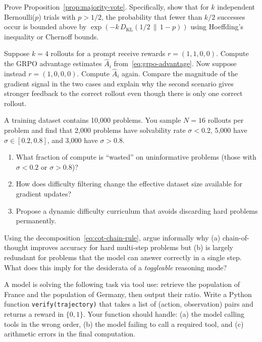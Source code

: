 \begin{exercise}
\label{ex:majority-vote-bound}
Prove Proposition~\ref{prop:majority-vote}. Specifically, show that
for $k$ independent Bernoulli($p$) trials with $p > 1/2$, the
probability that fewer than $k/2$ successes occur is bounded above
by $\exp(-k\,D_{\mathrm{KL}}(1/2\,\|\,1-p))$ using Hoeffding's inequality
or Chernoff bounds.
\end{exercise}

\begin{exercise}
\label{ex:grpo-advantage}
Suppose $k = 4$ rollouts for a prompt receive rewards $r = (1, 1, 0, 0)$.
Compute the GRPO advantage estimates $\hat{A}_i$ from~\eqref{eq:grpo-advantage}.
Now suppose instead $r = (1, 0, 0, 0)$. Compute $\hat{A}_i$ again.
Compare the magnitude of the gradient signal in the two cases and
explain why the second scenario gives stronger feedback to the correct
rollout even though there is only one correct rollout.
\end{exercise}

\begin{exercise}
\label{ex:difficulty-filter}
A training dataset contains 10{,}000 problems. You sample $N = 16$
rollouts per problem and find that 2{,}000 problems have solvability
rate $\sigma < 0.2$, 5{,}000 have $\sigma \in [0.2, 0.8]$, and 3{,}000
have $\sigma > 0.8$.
\begin{enumerate}[label=(\alph*)]
\item What fraction of compute is ``wasted'' on uninformative problems
  (those with $\sigma < 0.2$ or $\sigma > 0.8$)?
\item How does difficulty filtering change the effective dataset
  size available for gradient updates?
\item Propose a dynamic difficulty curriculum that avoids discarding
  hard problems permanently.
\end{enumerate}
\end{exercise}

\begin{exercise}
\label{ex:cot-information}
Using the decomposition~\eqref{eq:cot-chain-rule}, argue informally
why (a) chain-of-thought improves accuracy for hard multi-step
problems but (b) is largely redundant for problems that the model can
answer correctly in a single step. What does this imply for the
desiderata of a \emph{toggleable} reasoning mode?
\end{exercise}

\begin{exercise}
\label{ex:tool-calling-reward}
A model is solving the following task via tool use: retrieve the
population of France and the population of Germany, then output their
ratio. Write a Python function \texttt{verify(trajectory)} that takes
a list of (action, observation) pairs and returns a reward in
$\{0, 1\}$. Your function should handle: (a) the model calling tools
in the wrong order, (b) the model failing to call a required tool,
and (c) arithmetic errors in the final computation.
\end{exercise}

